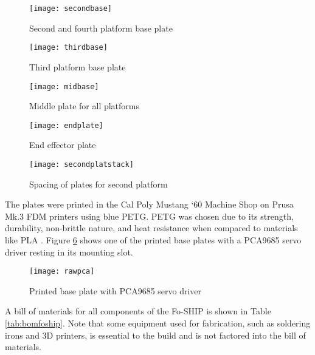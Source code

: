 \documentclass[12pt,a4paper]{report}
\begin{document}
\begin{figure}[htbp]
	\centering
	\texttt{[image: secondbase]}
	\caption{Second and fourth platform base plate}
	\label{fig:secondbase}
\end{figure}

\begin{figure}[htbp]
	\centering
	\texttt{[image: thirdbase]}
	\caption{Third platform base plate}
	\label{fig:thirdbase}
\end{figure}

\begin{figure}[htbp]
	\centering
	\texttt{[image: midbase]}
	\caption{Middle plate for all platforms}
	\label{fig:midbase}
\end{figure}

\begin{figure}[htbp]
	\centering
	\texttt{[image: endplate]}
	\caption{End effector plate}
	\label{fig:endplate}
\end{figure}

\begin{figure}[htbp]
	\centering
	\texttt{[image: secondplatstack]}
	\caption{Spacing of plates for second platform}
	\label{fig:secondplatstack}
\end{figure}

The plates were printed in the Cal Poly Mustang ‘60 Machine Shop on Prusa Mk.3 FDM printers using blue PETG. PETG was chosen due to its strength, durability, non-brittle nature, and heat resistance when compared to materials like PLA \cite{plapetg}. Figure \ref{fig:rawpca} shows one of the printed base plates with a PCA9685 servo driver resting in its mounting slot.

\begin{figure}[htbp]
	\centering
	\texttt{[image: rawpca]}
	\caption{Printed base plate with PCA9685 servo driver}
	\label{fig:rawpca}
\end{figure}

A bill of materials for all components of the Fo-SHIP is shown in Table \ref{tab:bomfoship}. Note that some equipment used for fabrication, such as soldering irons and 3D printers, is essential to the build and is not factored into the bill of materials.
\end{document}
